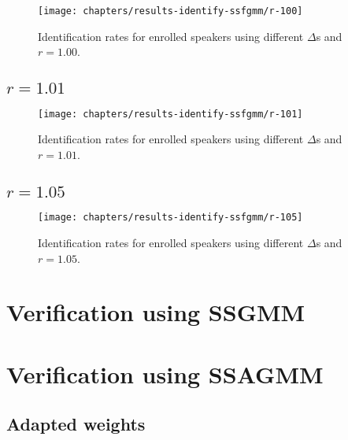 

\newpage
\begin{figure}[ht]
    \centering
    \texttt{[image: chapters/results-identify-ssfgmm/r-100]}
    \caption{Identification rates for enrolled speakers using different $\Delta$s and $r = 1.00$.}
    \label{fig:r-100}
\end{figure}

\newpage
\subsection{$r = 1.01$}



\newpage
\begin{figure}[ht]
    \centering
    \texttt{[image: chapters/results-identify-ssfgmm/r-101]}
    \caption{Identification rates for enrolled speakers using different $\Delta$s and $r = 1.01$.}
    \label{fig:r-101}
\end{figure}

\newpage
\subsection{$r = 1.05$}



\newpage
\begin{figure}[ht]
    \centering
    \texttt{[image: chapters/results-identify-ssfgmm/r-105]}
    \caption{Identification rates for enrolled speakers using different $\Delta$s and $r = 1.05$.}
    \label{fig:r-105}
\end{figure}

\section{Verification using SSGMM}
\label{sec:results-verify-ssgmm}

\section{Verification using SSAGMM}
\label{sec:results-verify-ssagmm}

\subsection{Adapted weights}

